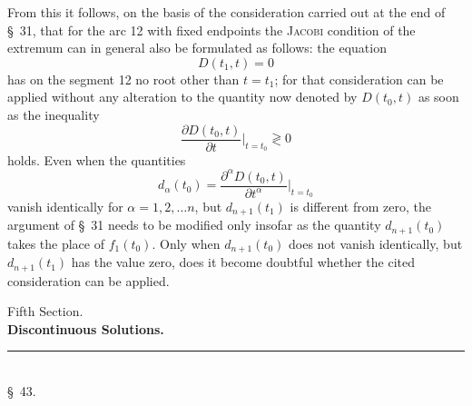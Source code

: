 \documentclass[11pt,a4paper,leqno]{article}
\begin{document}
From this it follows, on the basis of the consideration carried out at the end of \S~31, that for the arc 12 with fixed endpoints the \textsc{Jacobi} condition of the extremum can in general also be formulated as follows: the equation
\[
D(t_1,t)=0
\]
has on the segment 12 no root other than $t=t_1$; for that consideration can be applied without any alteration to the quantity now denoted by $D(t_0,t)$ as soon as the inequality
\[
\frac{\partial D(t_0,t)}{\partial t}\bigg|_{t=t_0}\gtrless 0
\]
holds. Even when the quantities
\[
d_\alpha(t_0)=\frac{\partial^\alpha D(t_0,t)}{\partial t^\alpha}\bigg|_{t=t_0}
\]
vanish identically for $\alpha=1,2,\ldots n$, but $d_{n+1}(t_1)$ is different from zero, the argument of \S~31 needs to be modified only insofar as the quantity $d_{n+1}(t_0)$ takes the place of $f_1(t_0)$. Only when $d_{n+1}(t_0)$ does not vanish identically, but $d_{n+1}(t_1)$ has the value zero, does it become doubtful whether the cited consideration can be applied.



\begin{center}
{\large Fifth Section.}\\[1.1ex]
{\Large\bfseries Discontinuous Solutions.}\\[2ex]
\rule{32mm}{0.4pt}\\[2ex]
{\large \S~43.}
\end{center}
\end{document}
